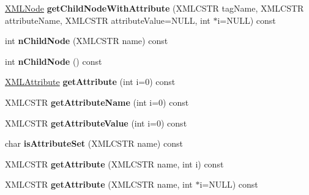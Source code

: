 \begin{DoxyCompactItemize}
\item 
\hyperlink{struct_x_m_l_node}{X\+M\+L\+Node} {\bfseries get\+Child\+Node\+With\+Attribute} (X\+M\+L\+C\+S\+TR tag\+Name, X\+M\+L\+C\+S\+TR attribute\+Name, X\+M\+L\+C\+S\+TR attribute\+Value=N\+U\+LL, int $\ast$i=N\+U\+LL) const \hypertarget{struct_x_m_l_node_a5d2775ee0704a2c028d76d267db7960a}{}\label{struct_x_m_l_node_a5d2775ee0704a2c028d76d267db7960a}

\item 
int {\bfseries n\+Child\+Node} (X\+M\+L\+C\+S\+TR name) const \hypertarget{struct_x_m_l_node_a8e52198f258167cd796dae21f1ffc352}{}\label{struct_x_m_l_node_a8e52198f258167cd796dae21f1ffc352}

\item 
int {\bfseries n\+Child\+Node} () const \hypertarget{struct_x_m_l_node_a65aad0220b231b1bf5cd5c69d7c5de41}{}\label{struct_x_m_l_node_a65aad0220b231b1bf5cd5c69d7c5de41}

\item 
\hyperlink{struct_x_m_l_attribute}{X\+M\+L\+Attribute} {\bfseries get\+Attribute} (int i=0) const \hypertarget{struct_x_m_l_node_aa07572a057ce7ffc8843e468d952f490}{}\label{struct_x_m_l_node_aa07572a057ce7ffc8843e468d952f490}

\item 
X\+M\+L\+C\+S\+TR {\bfseries get\+Attribute\+Name} (int i=0) const \hypertarget{struct_x_m_l_node_a67cf7717fa32175d8c6daa8f3f03ce7a}{}\label{struct_x_m_l_node_a67cf7717fa32175d8c6daa8f3f03ce7a}

\item 
X\+M\+L\+C\+S\+TR {\bfseries get\+Attribute\+Value} (int i=0) const \hypertarget{struct_x_m_l_node_a4abc0c5a3eec14e2f67518b625431541}{}\label{struct_x_m_l_node_a4abc0c5a3eec14e2f67518b625431541}

\item 
char {\bfseries is\+Attribute\+Set} (X\+M\+L\+C\+S\+TR name) const \hypertarget{struct_x_m_l_node_a8059888e8dd5d9caf04f765059c1b934}{}\label{struct_x_m_l_node_a8059888e8dd5d9caf04f765059c1b934}

\item 
X\+M\+L\+C\+S\+TR {\bfseries get\+Attribute} (X\+M\+L\+C\+S\+TR name, int i) const \hypertarget{struct_x_m_l_node_aba897c342d3c55d71f4d987332789f69}{}\label{struct_x_m_l_node_aba897c342d3c55d71f4d987332789f69}

\item 
X\+M\+L\+C\+S\+TR {\bfseries get\+Attribute} (X\+M\+L\+C\+S\+TR name, int $\ast$i=N\+U\+LL) const \hypertarget{struct_x_m_l_node_a23af0b5c771a9a5e7503a7dd2de72fc8}{}\label{struct_x_m_l_node_a23af0b5c771a9a5e7503a7dd2de72fc8}


\end{DoxyCompactItemize}
